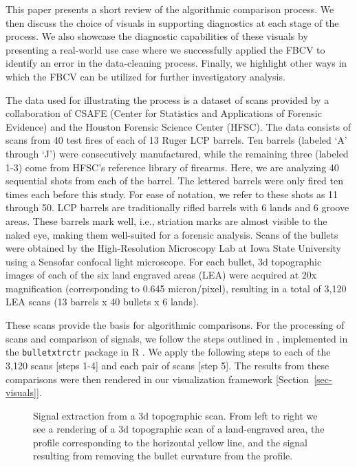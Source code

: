 \documentclass[
  12pt]{article}
\begin{document}
This paper presents a short review of the algorithmic comparison
process. We then discuss the choice of visuals in supporting diagnostics
at each stage of the process. We also showcase the diagnostic
capabilities of these visuals by presenting a real-world use case where
we successfully applied the FBCV to identify an error in the
data-cleaning process. Finally, we highlight other ways in which the
FBCV can be utilized for further investigatory analysis.

The data used for illustrating the process is a dataset of scans
provided by a collaboration of CSAFE (Center for Statistics and
Applications of Forensic Evidence) and the Houston Forensic Science
Center (HFSC). The data consists of scans from 40 test fires of each of
13 Ruger LCP barrels. Ten barrels (labeled `A' through `J') were
consecutively manufactured, while the remaining three (labeled 1-3) come
from HFSC's reference library of firearms. Here, we are analyzing 40
sequential shots from each of the barrel. The lettered barrels were only
fired ten times each before this study. For ease of notation, we refer
to these shots as 11 through 50. LCP barrels are traditionally rifled
barrels with 6 lands and 6 groove areas. These barrels mark well, i.e.,
striation marks are almost visible to the naked eye, making them
well-suited for a forensic analysis. Scans of the bullets were obtained
by the High-Resolution Microscopy Lab at Iowa State University using a
Sensofar confocal light microscope. For each bullet, 3d topographic
images of each of the six land engraved areas (LEA) were acquired at 20x
magnification (corresponding to 0.645 micron/pixel), resulting in a
total of 3,120 LEA scans (13 barrels x 40 bullets x 6 lands).

These scans provide the basis for algorithmic comparisons. For the
processing of scans and comparison of signals, we follow the steps
outlined in \citet{hareAutomaticMatchingBullet2017}, implemented in the
\texttt{bulletxtrctr} package in R
\citep{hofmannBulletxtrctrAutomaticMatching2022}. We apply the following
steps to each of the 3,120 scans {[}steps 1-4{]} and each pair of scans
{[}step 5{]}. The results from these comparisons were then rendered in
our visualization framework {[}Section~\ref{sec-visuals}{]}.

\begin{figure}


\caption{\label{fig-extracted-sigs}Signal extraction from a 3d
topographic scan. From left to right we see a rendering of a 3d
topographic scan of a land-engraved area, the profile corresponding to
the horizontal yellow line, and the signal resulting from removing the
bullet curvature from the profile.}

\end{figure}%
\end{document}

